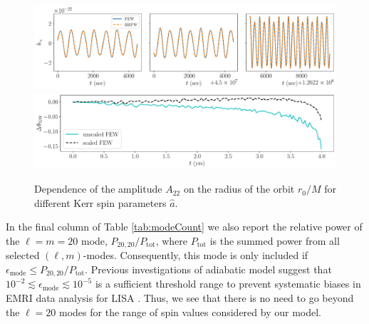 \documentclass[%
 reprint,
 nofootinbib,
 amsmath,amssymb,
 aps,
 prd,
]{revtex4-2}
\begin{document}
\begin{figure}[!htp]
    \centering
    \includegraphics[width=0.98\linewidth]{figures/few_bhpwave_overlay.pdf}
    \includegraphics[width=0.98\linewidth]{figures/few_phase_comparison.pdf}
    \caption{Dependence of the amplitude $A_{22}$ on the radius of the orbit $r_0/M$ for different Kerr spin parameters $\hat{a}$.}
    \label{fig:compareFEW}
\end{figure}


In the final column of Table \ref{tab:modeCount} we also report the relative power of the $\ell = m = 20$ mode, $P_{20,20}/P_\mathrm{tot}$, where $P_\mathrm{tot}$ is the summed power from all selected $(\ell, m)$-modes. Consequently, this mode is only included if $\epsilon_\mathrm{mode} \leq P_{20,20}/P_\mathrm{tot}$. Previous investigations of adiabatic model suggest that $ 10^{-2} \lesssim \epsilon_\mathrm{mode} \lesssim 10^{-5}$ is a sufficient threshold range to prevent systematic biases in EMRI data analysis for LISA \cite{KatzETC20}. Thus, we see that there is no need to go beyond the $\ell = 20$ modes for the range of spin values considered by our model.
\end{document}
